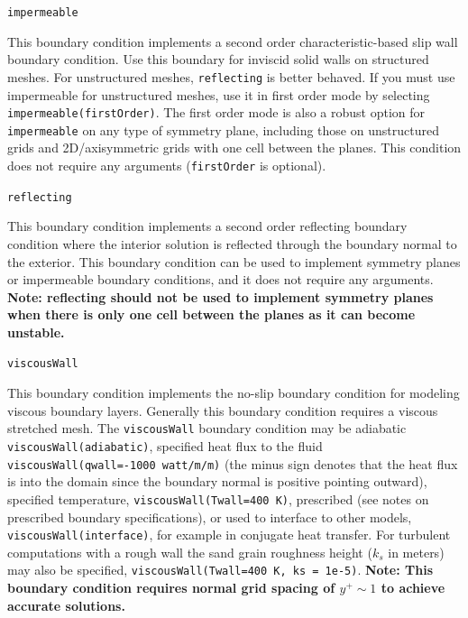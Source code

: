 \documentclass{article}
\begin{document}
\begin{list}{}{}
  \item {\tt impermeable}

    This boundary condition implements a second order
    characteristic-based slip wall boundary condition.  Use this
    boundary for inviscid solid walls on structured meshes.  For
    unstructured meshes, {\tt reflecting} is better behaved.  If you
    must use impermeable for unstructured meshes, use it in first
    order mode by selecting {\tt impermeable(firstOrder)}.  The first
    order mode is also a robust option for {\tt impermeable} on any
    type of symmetry plane, including those on unstructured grids and
    2D/axisymmetric grids with one cell between the planes.  This
    condition does not require any arguments ({\tt firstOrder} is
    optional).

  \item {\tt reflecting}

    This boundary condition implements a second order reflecting
    boundary condition where the interior solution is reflected through
    the boundary normal to the exterior.  This boundary condition can
    be used to implement symmetry planes or impermeable boundary
    conditions, and it does not require any arguments.
    {\bf Note: reflecting should not be used to implement symmetry
    planes when there is only one cell between the planes as it can become
    unstable.}

  \item {\tt viscousWall}

    {\sloppy 
    This boundary condition implements the no-slip boundary condition
    for modeling viscous boundary layers.  Generally this boundary
    condition requires a viscous stretched mesh.  The {\tt viscousWall}
    boundary condition may be adiabatic {\tt viscousWall(adiabatic)},
    specified heat flux to the fluid {\tt viscousWall(qwall=-1000 watt/m/m)}
    (the minus sign denotes that the heat flux is into the domain since the
    boundary normal is positive pointing outward),
    specified temperature, {\tt viscousWall(Twall=400 K)}, prescribed (see notes
    on prescribed boundary specifications), or used to
    interface to other models, {\tt viscousWall(interface)}, for
    example in conjugate heat transfer.  For turbulent computations with a rough wall
    the sand grain roughness height ($k_s$ in meters) may also be specified,
    {\tt viscousWall(Twall=400 K, ks = 1e-5)}.
    {\bf Note: This boundary condition requires normal grid spacing of $y^+ \sim 1$ to
    achieve accurate solutions.}
}
                               

\end{list}
\end{document}
